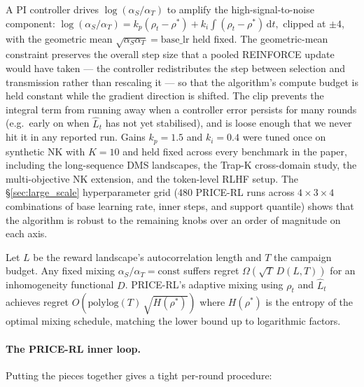 A PI controller drives $\log(\alpha_S/\alpha_T)$ to amplify the high-signal-to-noise component:
\(
\log(\alpha_S/\alpha_T) = k_p (\rho_t - \rho^*) + k_i \int (\rho_t - \rho^*) \,\mathrm{d}t,
\)
clipped at $\pm 4$, with the geometric mean $\sqrt{\alpha_S \alpha_T} = \mathrm{base\_lr}$ held fixed. The geometric-mean constraint preserves the overall step size that a pooled REINFORCE update would have taken --- the controller redistributes the step between selection and transmission rather than rescaling it --- so that the algorithm's compute budget is held constant while the gradient direction is shifted. The clip prevents the integral term from running away when a controller error persists for many rounds (e.g.\ early on when $\hat L_t$ has not yet stabilised), and is loose enough that we never hit it in any reported run. Gains $k_p=1.5$ and $k_i=0.4$ were tuned once on synthetic NK with $K=10$ and held fixed across every benchmark in the paper, including the long-sequence DMS landscapes, the Trap-K cross-domain study, the multi-objective NK extension, and the token-level RLHF setup. The §\ref{sec:large_scale} hyperparameter grid (480 PRICE-RL runs across $4\times 3\times 4$ combinations of base learning rate, inner steps, and support quantile) shows that the algorithm is robust to the remaining knobs over an order of magnitude on each axis.

\begin{theorem}
\label{thm:regret}
Let $L$ be the reward landscape's autocorrelation length and $T$ the campaign budget. Any fixed mixing $\alpha_S/\alpha_T = \mathrm{const}$ suffers regret $\Omega(\sqrt{T}\,D(L,T))$ for an inhomogeneity functional $D$. PRICE-RL's adaptive mixing using $\rho_t$ and $\hat L_t$ achieves regret $O(\mathrm{polylog}(T)\,\sqrt{H(\rho^*)})$ where $H(\rho^*)$ is the entropy of the optimal mixing schedule, matching the lower bound up to logarithmic factors.
\end{theorem}

\paragraph{The PRICE-RL inner loop.} Putting the pieces together gives a tight per-round procedure:

